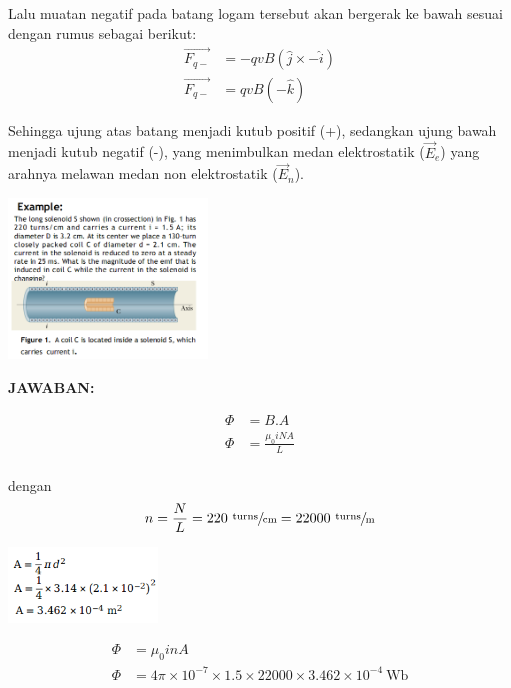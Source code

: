 \documentclass[twocolumn, 11pt]{article}%
\begin{document}
Lalu muatan negatif pada batang logam tersebut akan bergerak ke bawah
sesuai dengan rumus sebagai berikut:
\begin{align*}
    \overrightarrow{F_{q-}} &= -qvB(\hat j \times -\hat i)\\
    \overrightarrow{F_{q-}} &= qvB(-\hat k)
\end{align*}

Sehingga ujung atas batang menjadi kutub positif (+), sedangkan ujung bawah
menjadi kutub negatif (-), yang menimbulkan medan elektrostatik
($\vec E_e$) yang arahnya melawan medan non elektrostatik ($\vec E_n$).\\

\begin{center}
    \includegraphics[width=200px]{4.png}\\
\end{center}

\textbf{JAWABAN:}

\begin{align*}
    \Phi &= B.A\\
    \Phi &= \frac{\mu_0iNA}{L}\\
\end{align*}

dengan
\[n=\frac{N}L =220\ \sfrac{\text{turns}}{\text{cm}} = 22000\
\sfrac{\text{turns}}{\text{m}} \]

\begin{center}
    \includegraphics[width=150px]{5.png}
\end{center}

\begin{align*}
    \Phi &= \mu_0 inA\\
    \Phi &= 4\pi \times 10^{-7} \times 1.5 \times 22000 \times 3.462
    \times 10^{-4}\ \text{Wb}
\end{align*} 
\end{document}
